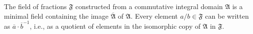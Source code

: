 The field of fractions $\mathfrak{F}$ constructed from a commutative integral domain $\mathfrak{A}$ is a minimal field containing the image $\overline{\mathfrak{A}}$ of $\mathfrak{A}$. Every element $a/b \in \mathfrak{F}$ can be written as $\overline{a} \cdot \overline{b}^{-1}$, i.e., as a quotient of elements in the isomorphic copy of $\mathfrak{A}$ in $\mathfrak{F}$.
